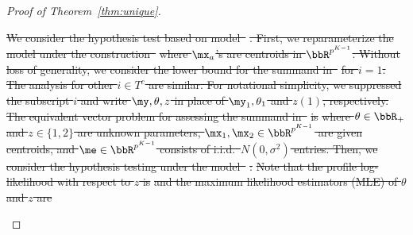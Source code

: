 \documentclass[lettersize,onecolumn,journal]{IEEEtran}
\theoremstyle{definition}
\theoremstyle{definition}
\newcommand{\of}[1]{\left(#1\right)}
\newcommand{\off}[1]{\left[#1\right]}
\newcommand{\offf}[1]{\left\{#1\right\}}
\providecommand{\DIFdeltex}[1]{{\protect\color{red}\sout{#1}}}                      %
\providecommand{\DIFdel}[1]{\texorpdfstring{\DIFdeltex{#1}}{}} %
\begin{document}
\begin{proof}[Proof of Theorem~\ref{thm:unique}]
\begin{enumerate}[wide]
\DIFdel{We consider the hypothesis test based on model~}%
\DIFdel{. First, we reparameterize the model under the construction~}%
\DIFdel{where $\mx_a$'s are centroids in $\bbR^{p^{K-1}}$. Without loss of generality, we consider the lower bound for the summand in~}%
\DIFdel{for $i=1$. The analysis for other $i\in T^c$ are similar. For notational simplicity, we suppressed the subscript $i$ and write $\my, \theta, z$ in place of $\my_1, \theta_1$ and $z(1)$, respectively. The equivalent vector problem for assessing the summand in~}%
\DIFdel{is
}%
\DIFdel{where $\theta\in\bbR_{+}$ and $z\in \{1,2\}$ are unknown parameters, $\mx_1,\mx_2\in\bbR^{p^{K-1}}$ are given centroids, and $\me\in\bbR^{p^{K-1}}$ consists of i.i.d.\ $N(0,\sigma^2)$ entries.  Then, we consider the hypothesis testing under the model~}%
\DIFdel{:
}%
\DIFdel{Note that the profile log-likelihood with respect to $z$ is
}%
\DIFdel{and the maximum likelihood estimators (MLE) of $\theta$ and $z$ are
}%


\end{enumerate}
\end{proof}
\end{document}

